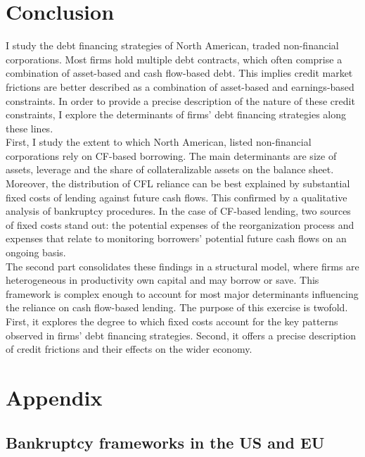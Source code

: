 \documentclass[12pt]{article}
\begin{document}
\section{Conclusion \label{Concl}}
I study the debt financing strategies of North American, traded non-financial corporations. Most firms hold multiple debt contracts, which often comprise a combination of asset-based and cash flow-based debt.  This implies credit market frictions are better described as a combination of asset-based and earnings-based constraints. In order to provide a precise description of the nature of these credit constraints, I explore the determinants of firms’ debt financing strategies along these lines. \vspace{3mm} \\
First, I study the extent to which North American, listed non-financial corporations rely on CF-based borrowing. The main determinants are size of assets, leverage and the share of collateralizable assets on the balance sheet. Moreover, the distribution of CFL reliance can be best explained by substantial fixed costs of lending against future cash flows. This confirmed by a qualitative analysis of bankruptcy procedures. In the case of CF-based lending, two sources of fixed costs stand out: the potential expenses of the reorganization process and expenses that relate to monitoring borrowers’ potential future cash flows on an ongoing basis. \vspace{3mm} \\
The second part consolidates these findings in a structural model, where firms are heterogeneous in productivity own capital and may borrow or save. This framework is complex enough to account for most major determinants influencing the reliance on cash flow-based lending. The purpose of this exercise is twofold. First, it explores the degree to which fixed costs account for the key patterns observed in firms' debt financing strategies. Second, it offers a precise description of credit frictions and their effects on the wider economy.

\setcounter{table}{0}
\setcounter{figure}{0}
\setcounter{section}{0}

\section{Appendix \label{sec:appendix}}
\subsection{Bankruptcy frameworks in the US and EU  \label{sec:A1}}
\end{document}
